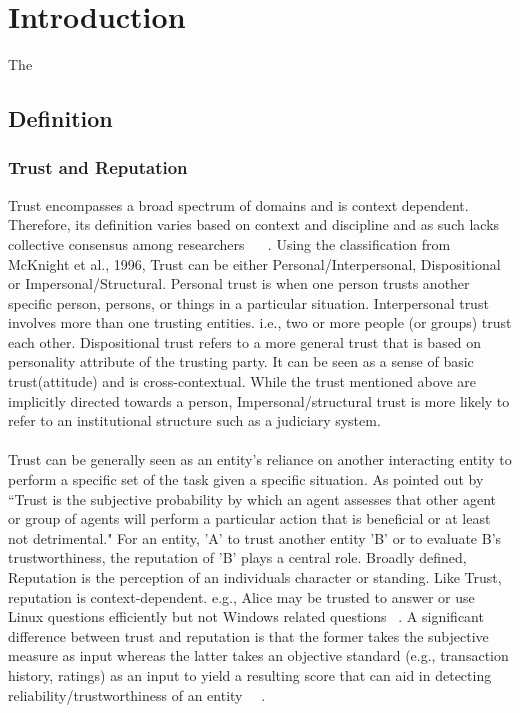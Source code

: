 \chapter{Introduction} \label{ch:intro}
The 

\section{Definition}
\subsection{Trust and Reputation}
Trust encompasses a broad spectrum of domains and is context dependent.
Therefore, its definition varies based on context and discipline and as such
lacks collective consensus among researchers ~\cite{mcknight1996meanings} 
~\cite{mcknight2001trust}.
Using the classification from McKnight et al., 1996, Trust can be either
Personal/Interpersonal, Dispositional or Impersonal/Structural.
Personal trust is when one person trusts another specific person, persons, or
things in a particular situation. Interpersonal trust involves more than one
trusting entities. i.e., two or more people (or groups) trust each other.
Dispositional trust refers to a more general trust that is based on personality
attribute of the trusting party. It can be seen as a sense of basic
trust(attitude) and is cross-contextual. While the trust mentioned above are
implicitly directed towards a person, Impersonal/structural trust is more
likely to refer to an institutional structure such as a judiciary system.\\\\ 
Trust can be generally seen as an entity's reliance on another interacting
entity to perform a specific set of the task given a specific situation.  As
pointed out by ~\cite{gambetta2000can} ``Trust is the subjective probability by
which an agent assesses that other agent or group of agents will perform a
particular action that is beneficial or at least not detrimental."
For an entity, 'A' to trust another entity 'B' or to evaluate B's
trustworthiness, the reputation of 'B' plays a central role. Broadly defined,
Reputation is the perception of an individuals character or standing. Like
Trust, reputation is context-dependent. e.g., Alice may be trusted to 
answer or use Linux questions efficiently but not Windows related questions
~\cite{zacharia2000collaborative}.
A significant difference between trust and
reputation is that the former takes the subjective measure as input whereas the
latter takes an objective standard (e.g., transaction history, ratings) as an
input to yield a resulting score that can aid in detecting
reliability/trustworthiness of an entity~\cite{Sabater2005} ~\cite{castelfranchi2000trust}. \\

